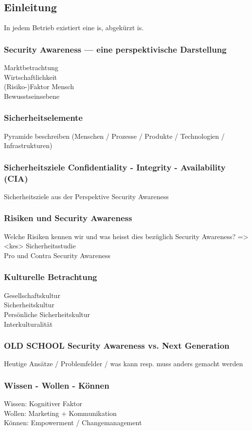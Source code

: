 \documentclass[../../main.tex]{subfiles}
\begin{document}
\subsection{Einleitung}
In jedem Betrieb existiert eine \acrlong{is}, abgekürzt \acrshort{is}.

\subsubsection{Security Awareness — eine perspektivische Darstellung}
    Marktbetrachtung\\
    Wirtschaftlichkeit\\
    (Risiko-)Faktor Mensch\\
    Bewusstseinsebene
\subsubsection{Sicherheitselemente}
    Pyramide beschreiben (Menschen / Prozesse / Produkte / Technologien / Infrastrukturen)
\subsubsection{Sicherheitsziele Confidentiality - Integrity - Availability (CIA)}
    Sicherheitsziele aus der Perspektive Security Awareness
\subsubsection{Risiken und Security Awareness}
    Welche Risiken kennen wir und was heisst dies bezüglich Security Awareness? => <kes> Sicherheitsstudie\\
    Pro und Contra Security Awareness
\subsubsection{Kulturelle Betrachtung}
    Gesellschaftskultur\\
    Sicherheitskultur\\
    Persönliche Sicherheitskultur\\
    Interkulturalität
 \subsubsection{OLD SCHOOL Security Awareness vs. Next Generation}
    Heutige Ansätze / Problemfelder / was kann resp. muss anders gemacht werden
\subsubsection{Wissen - Wollen - Können}
    Wissen: Kognitiver Faktor\\
    Wollen: Marketing + Kommunikation\\
    Können: Empowerment / Changemanagement
\end{document}
